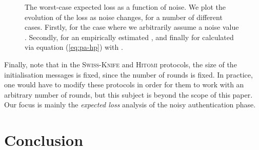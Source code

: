 \documentclass[a4paper]{article}
\newcommand \Swiss {\textsc{Swiss-Knife}}
\newcommand \Hitomi {\textsc{Hitomi}}
\theoremstyle{plain} \newtheorem{remark}{Remark}
\theoremstyle{plain} \newtheorem{definition}{Definition}
\theoremstyle{plain} \newtheorem{example}{Example}
\theoremstyle{plain} \newtheorem{assumption}{Assumption}
\theoremstyle{plain} \newtheorem{conjecture}{Conjecture}
\theoremstyle{plain} \newtheorem{theorem}{Theorem}
\theoremstyle{plain} \newtheorem{proposition}{Proposition}
\theoremstyle{plain} \newtheorem{lemma}{Lemma}
\theoremstyle{plain} \newtheorem{corollary}{Corollary}
\begin{document}
\begin{figure}
\centering
{}
\caption{The worst-case expected loss as a function of noise. We plot
 the evolution of the loss as noise changes, for a number of
 different cases. Firstly, for the case where we arbitrarily assume a
 noise value . Secondly, for an empirically estimated , and finally for  calculated via equation
(\ref{eq:pa-hp}) with .}
\label{fig:loss-comparison}
\end{figure}

Finally, note that in the {\Swiss} and {\Hitomi} protocols, the size
of the initialisation messages is fixed, since the number of rounds
 is fixed.  In practice, one would have to modify these protocols
in order for them to work with an arbitrary number of rounds, but this
subject is beyond the scope of this paper. Our focus is mainly the
{\em expected loss} analysis of the noisy authentication phase.


\section{Conclusion}
\label{sec:conclusion} 
\end{document}
